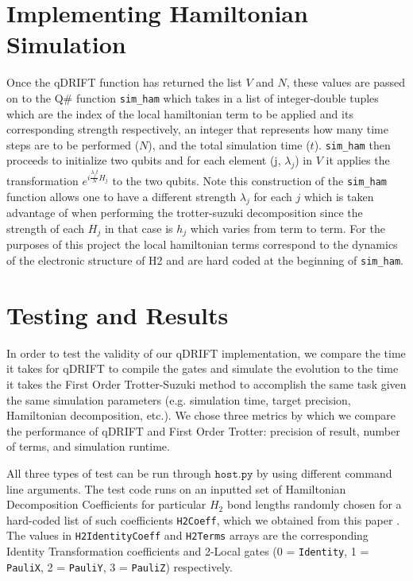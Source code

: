 \documentclass[letterpaper, 11pt]{article}
\begin{document}
\section*{Implementing Hamiltonian Simulation}
Once the qDRIFT function has returned the list $V$ and $N$, these values are passed on to the Q\# function \texttt{sim\_ham} which takes in a list of integer-double tuples which are the index of the local hamiltonian term to be applied and its corresponding strength respectively, an integer that represents how many time steps are to be performed ($N$), and the total simulation time ($t$). \texttt{sim\_ham} then proceeds to initialize two qubits and for each element (j, $\lambda_j$) in $V$ it applies the transformation $e^{i\frac{\lambda_j t}{N} H_j}$ to the two qubits. Note this construction of the \texttt{sim\_ham} function allows one to have a different strength $\lambda_j$ for each $j$ which is taken advantage of when performing the trotter-suzuki decomposition since the strength of each $H_j$ in that case is $h_j$ which varies from term to term. For the purposes of this project the local hamiltonian terms correspond to the dynamics of the electronic structure of H2 and are hard coded at the beginning of \texttt{sim\_ham}.

\section*{Testing and Results}
In order to test the validity of our qDRIFT implementation, we compare the time it takes for qDRIFT to compile the gates and simulate the evolution to the time it takes the First Order Trotter-Suzuki method to accomplish the same task given the same simulation parameters (e.g. simulation time, target precision, Hamiltonian decomposition, etc.). We chose three metrics by which we compare the performance of qDRIFT and First Order Trotter: precision of result, number of terms, and simulation runtime.

All three types of test can be run through $\texttt{host.py}$ by using different command line arguments. The test code runs on an inputted set of Hamiltonian Decomposition Coefficients for particular $H_2$ bond lengths randomly chosen for a hard-coded list of such coefficients \texttt{H2Coeff}, which we obtained from this paper \cite{PhysRevX.6.031007}. The values in \texttt{H2IdentityCoeff} and \texttt{H2Terms} arrays are the corresponding Identity Transformation coefficients and 2-Local gates (0 = \texttt{Identity}, 1 = \texttt{PauliX}, 2 = \texttt{PauliY}, 3 = \texttt{PauliZ}) respectively.
\end{document}
